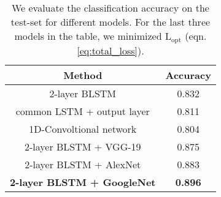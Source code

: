 \documentclass{article}
\begin{document}
\begin{table}
\parbox{\linewidth}{
\centering
\begin{tabular}{cc}
\hline
\textbf{Method} & \textbf{Accuracy}\\
\hline
2-layer BLSTM & 0.832\\
common LSTM + output layer \cite{spampinato2017deep} & 0.811\\
1D-Convoltional network \cite{aytar2016soundnet} & 0.804\\
2-layer BLSTM + VGG-19 & 0.875\\
2-layer BLSTM + AlexNet & 0.883\\
\textbf{2-layer BLSTM + GoogleNet}  & \textbf{0.896}\\
\hline
\end{tabular}
\caption{We evaluate the classification accuracy on the test-set for different models. For the last three models in the table, we minimized $\mathrm{L_{opt}}$ (eqn. \ref{eq:total_loss}).}
\label{tab: exp1}
}
\end{table}
 
\end{document}
